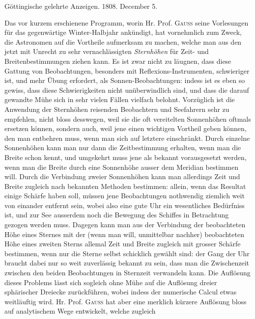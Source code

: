 \clearpage
{}%
\begin{center}\small Göttingische gelehrte Anzeigen. 1808. December 5.\end{center}
\medskip
Das vor kurzem erschienene Programm, worin Hr. Prof. \textsc{Gauss} seine Vorlesungen
für das gegenwärtige Winter-Halbjahr ankündigt, hat vornehmlich zum
Zweck, die Astronomen auf die Vortheile aufmerksam zu machen, welche man
aus den jetzt mit Unrecht zu sehr vernachlässigten \textit{Sternhöhen} für Zeit- und Breitenbestimmungen
ziehen kann. Es ist zwar nicht zu läugnen, dass diese Gattung
von Beobachtungen, besonders mit Reflexions-Instrumenten, schwieriger
ist, und mehr Übung erfordert, als Sonnen-Beobachtungen: indess ist es eben
so gewiss, dass diese Schwierigkeiten nicht unüberwindlich sind, und dass die
darauf gewandte Mühe sich in sehr vielen Fällen vielfach belohnt. Vorzüglich
ist die Anwendung der Sternhöhen reisenden Beobachtern und Seefahrern sehr
zu empfehlen, nicht bloss desswegen, weil sie die oft vereitelten Sonnenhöhen
oftmals ersetzen können, sondern auch, weil jene einen wichtigen Vortheil geben
können, den man entbehren muss, wenn man sich auf letztere einschränkt.
Durch einzelne Sonnenhöhen kann man nur dann die Zeitbestimmung erhalten,
wenn man die Breite schon kennt, und umgekehrt muss jene als bekannt vorausgesetzt
werden, wenn man die Breite durch eine Sonnenhöhe ausser dem
Meridian bestimmen will. Durch die Verbindung zweier Sonnenhöhen kann
man allerdings Zeit und Breite zugleich nach bekannten Methoden bestimmen:
allein, wenn das Resultat einige Schärfe haben soll, müssen jene Beobachtungen
%
nothwendig ziemlich weit von einander entfernt sein, wobei also eine gute Uhr
ein wesentliches Bedürfniss ist, und zur See ausserdem noch die Bewegung des
Schiffes in Betrachtung gezogen werden muss. Dagegen kann man aus der Verbindung
der beobachteten Höhe eines Sternes mit der (wenn man will, unmittelbar
nachher) beobachteten Höhe eines zweiten Sterns allemal Zeit und Breite zugleich
mit grosser Schärfe bestimmen, wenn nur die Sterne selbst schicklich gewählt
sind: der Gang der Uhr braucht dabei nur so weit zuverlässig bekannt zu
sein, dass man die Zwischenzeit zwischen den beiden Beobachtungen in Sternzeit
verwandeln kann. Die Auflösung dieses Problems lässt sich sogleich ohne
Mühe auf die Auflösung dreier sphärischer Dreiecke zurückführen, wobei indess
der numerische Calcul etwas weitläuftig wird. Hr. Prof. \textsc{Gauss} hat aber eine
merklich kürzere Auflösung bloss auf analytischem Wege entwickelt, welche zugleich
